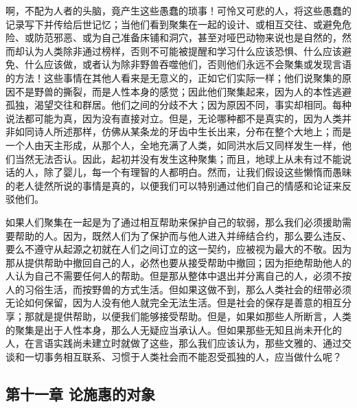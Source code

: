 啊，不配为人者的头脑，竟产生这些愚蠢的琐事！可怜又可悲的人，将这些愚蠢的记录写下并传给后世记忆；当他们看到聚集在一起的设计、或相互交往、或避免危险、或防范邪恶、或为自己准备床铺和洞穴，甚至对哑巴动物来说也是自然的，然而却认为人类除非通过榜样，否则不可能被提醒和学习什么应该恐惧、什么应该避免、什么应该做，或者认为除非野兽吞噬他们，否则他们永远不会聚集或发现言语的方法！这些事情在其他人看来是无意义的，正如它们实际一样；他们说聚集的原因不是野兽的撕裂，而是人性本身的感觉；因此他们聚集起来，因为人的本性逃避孤独，渴望交往和群居。他们之间的分歧不大；因为原因不同，事实却相同。每种说法都可能为真，因为没有直接对立。但是，无论哪种都不是真实的，因为人类并非如同诗人所述那样，仿佛从某条龙的牙齿中生长出来，分布在整个大地上；而是一个人由天主形成，从那个人，全地充满了人类，如同洪水后又同样发生一样，他们当然无法否认。因此，起初并没有发生这种聚集；而且，地球上从未有过不能说话的人，除了婴儿，每一个有理智的人都明白。然而，让我们假设这些懒惰而愚昧的老人徒然所说的事情是真的，以便我们可以特别通过他们自己的情感和论证来反驳他们。\par

如果人们聚集在一起是为了通过相互帮助来保护自己的软弱，那么我们必须援助需要帮助的人。因为，既然人们为了保护而与他人进入并缔结合约，那么要么违反、要么不遵守从起源之初就在人们之间订立的这一契约，应被视为最大的不敬。因为那从提供帮助中撤回自己的人，必然也要从接受帮助中撤回；因为拒绝帮助他人的人认为自己不需要任何人的帮助。但是那从整体中退出并分离自己的人，必须不按人的习俗生活，而按野兽的方式生活。但如果这做不到，那么人类社会的纽带必须无论如何保留，因为人没有他人就完全无法生活。但是社会的保存是善意的相互分享；那就是提供帮助，以便我们能够接受帮助。但是，如果如那些人所断言，人类的聚集是出于人性本身，那么人无疑应当承认人。但如果那些无知且尚未开化的人，在言语实践尚未建立时就做了这些，那么我们应该认为，那些文雅的、通过交谈和一切事务相互联系、习惯于人类社会而不能忍受孤独的人，应当做什么呢？\par


\subsection{第十一章 论施惠的对象}

